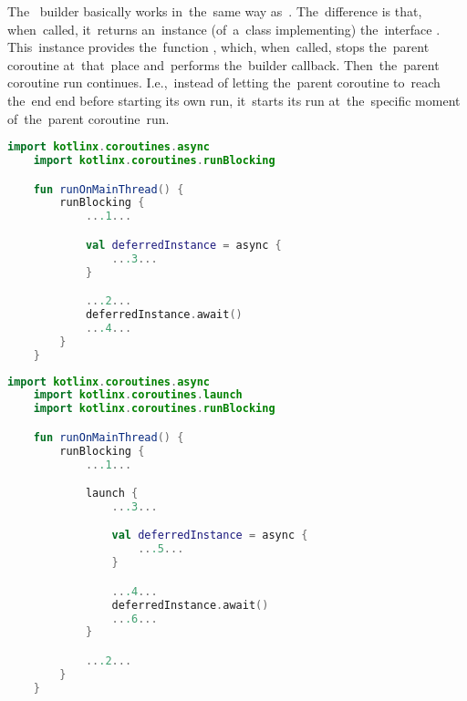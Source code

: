 \label{kotlincoroutineasync}
The~ builder basically works in~the~same way as~.
The~difference is that, when~called, it~returns an~instance (of~a~class implementing) the~interface .
This~instance provides the~function , which, when~called, stops the~parent coroutine at~that~place and~performs the~builder callback.
Then~the~parent coroutine run continues.
I.e.,~instead of letting the~parent coroutine to~reach the~end end before starting its own run, it~starts its run at~the~specific moment of~the~parent coroutine~run.

\begin{lstlisting}[language=Kotlin, title={Numbers represent the~order of~execution}]
    import kotlinx.coroutines.async
    import kotlinx.coroutines.runBlocking

    fun runOnMainThread() {
        runBlocking {
            ...1...

            val deferredInstance = async {
                ...3...
            }

            ...2...
            deferredInstance.await()
            ...4...
        }
    }
\end{lstlisting}

\begin{lstlisting}[language=Kotlin, title={Numbers represent the~order of~execution}]
    import kotlinx.coroutines.async
    import kotlinx.coroutines.launch
    import kotlinx.coroutines.runBlocking

    fun runOnMainThread() {
        runBlocking {
            ...1...

            launch {
                ...3...

                val deferredInstance = async {
                    ...5...
                }

                ...4...
                deferredInstance.await()
                ...6...
            }

            ...2...
        }
    }
\end{lstlisting}

